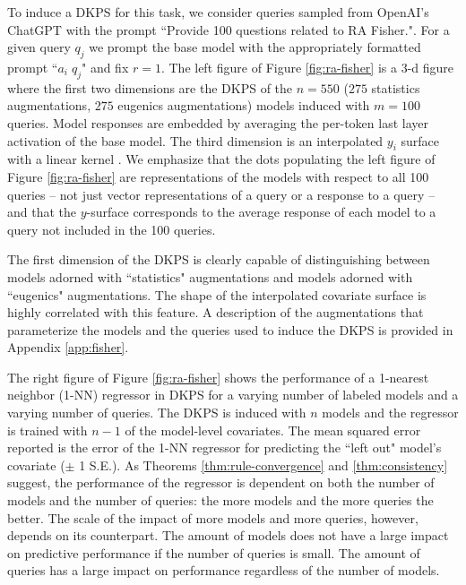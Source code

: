 To induce a DKPS for this task, we consider queries sampled from OpenAI's ChatGPT with the prompt ``Provide 100 questions related to RA Fisher.".  
For a given query $ q_{j} $ we prompt the base model with the appropriately formatted prompt ``$a_{i} \; q_{j}$" and fix $ r = 1 $.
The left figure of Figure \ref{fig:ra-fisher} is a 3-d figure where the first two dimensions are the DKPS of the $ n = 550 $ ($ 275 $ statistics augmentations, $ 275 $ eugenics augmentations) models induced with $ m = 100 $ queries. Model responses are embedded by averaging the per-token last layer activation of the base model.  
The third dimension is an interpolated $ y_{i} $ surface with a linear kernel \citep{du2008radial}. 
We emphasize that the dots populating the left figure of Figure \ref{fig:ra-fisher} are representations of the models with respect to all 100 queries -- not just vector representations of a query or a response to a query -- and that the $ y $-surface corresponds to the average response of each model to a query not included in the 100 queries.

The first dimension of the DKPS is clearly capable of distinguishing between models adorned with ``statistics" augmentations and models adorned with ``eugenics" augmentations. 
The shape of the interpolated covariate surface is highly correlated with this feature.
A description of the augmentations that parameterize the models and the queries used to induce the DKPS is provided in Appendix \ref{app:fisher}.

The right figure of Figure \ref{fig:ra-fisher} shows the performance of a 1-nearest neighbor (1-NN) regressor in DKPS for a varying number of labeled models and a varying number of queries. 
The DKPS is induced with $ n $ models and the regressor is trained with $ n - 1 $ of the model-level covariates. 
The mean squared error reported is the error of the 1-NN regressor for predicting the ``left out" model's covariate ($\pm$ 1 S.E.).
As Theorems \ref{thm:rule-convergence} and \ref{thm:consistency} suggest, the performance of the regressor is dependent on both the number of models and the number of queries: the more models and the more queries the better.
The scale of the impact of more models and more queries, however, depends on its counterpart. 
The amount of models does not have a large impact on predictive performance if the number of queries is small. 
The amount of queries has a large impact on performance regardless of the number of models.